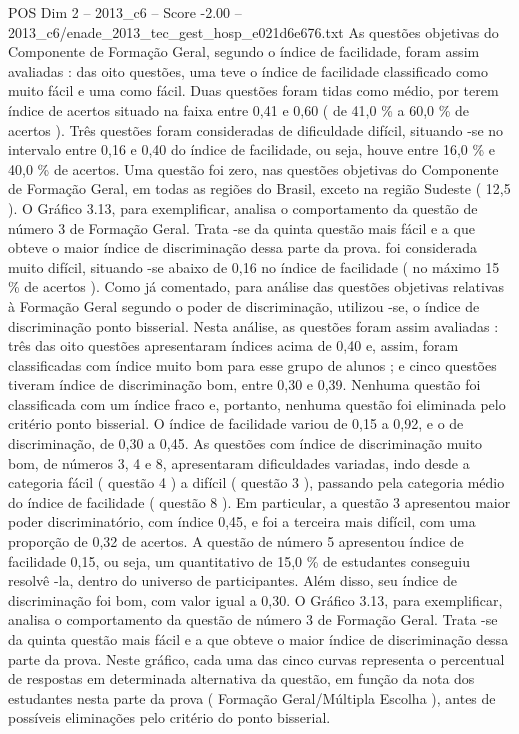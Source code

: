 \begin{textsample}{POS Dim 2 – 2013\_c6 – Score -2.00 – 2013\_c6/enade\_2013\_tec\_gest\_hosp\_e021d6e676.txt}
As questões objetivas do Componente de Formação Geral, segundo o índice de facilidade, foram assim avaliadas : das oito questões, uma teve o índice de facilidade classificado como muito fácil e uma como fácil.
Duas questões foram tidas como médio, por terem índice de acertos situado na faixa entre 0,41 e 0,60 ( de 41,0 \% a 60,0 \% de acertos ).
Três questões foram consideradas de dificuldade difícil, situando -se no intervalo entre 0,16 e 0,40 do índice de facilidade, ou seja, houve entre 16,0 \% e 40,0 \% de acertos.
Uma questão foi zero, nas questões objetivas do Componente de Formação Geral, em todas as regiões do Brasil, exceto na região Sudeste ( 12,5 ).
O Gráfico 3.13, para exemplificar, analisa o comportamento da questão de número 3 de Formação Geral.
Trata -se da quinta questão mais fácil e a que obteve o maior índice de discriminação dessa parte da prova. foi considerada muito difícil, situando -se abaixo de 0,16 no índice de facilidade ( no máximo 15 \% de acertos ).
Como já comentado, para análise das questões objetivas relativas à Formação Geral segundo o poder de discriminação, utilizou -se, o índice de discriminação ponto bisserial.
Nesta análise, as questões foram assim avaliadas : três das oito questões apresentaram índices acima de 0,40 e, assim, foram classificadas com índice muito bom para esse grupo de alunos ; e cinco questões tiveram índice de discriminação bom, entre 0,30 e 0,39.
Nenhuma questão foi classificada com um índice fraco e, portanto, nenhuma questão foi eliminada pelo critério ponto bisserial.
O índice de facilidade variou de 0,15 a 0,92, e o de discriminação, de 0,30 a 0,45.
As questões com índice de discriminação muito bom, de números 3, 4 e 8, apresentaram dificuldades variadas, indo desde a categoria fácil ( questão 4 ) a difícil ( questão 3 ), passando pela categoria médio do índice de facilidade ( questão 8 ).
Em particular, a questão 3 apresentou maior poder discriminatório, com índice 0,45, e foi a terceira mais difícil, com uma proporção de 0,32 de acertos.
A questão de número 5 apresentou índice de facilidade 0,15, ou seja, um quantitativo de 15,0 \% de estudantes conseguiu resolvê -la, dentro do universo de participantes.
Além disso, seu índice de discriminação foi bom, com valor igual a 0,30.
O Gráfico 3.13, para exemplificar, analisa o comportamento da questão de número 3 de Formação Geral.
Trata -se da quinta questão mais fácil e a que obteve o maior índice de discriminação dessa parte da prova.
Neste gráfico, cada uma das cinco curvas representa o percentual de respostas em determinada alternativa da questão, em função da nota dos estudantes nesta parte da prova ( Formação Geral/Múltipla Escolha ), antes de possíveis eliminações pelo critério do ponto bisserial.

\end{textsample}
